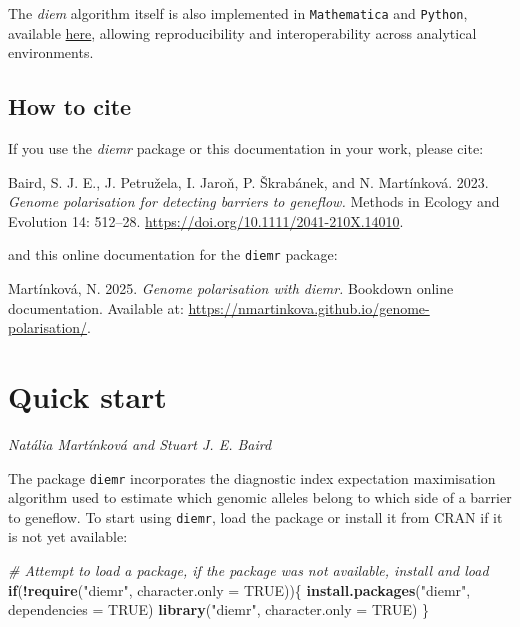\documentclass[
]{book}
\newenvironment{Shaded}{\begin{snugshade}}{\end{snugshade}}
\newcommand{\AttributeTok}[1]{\textcolor[rgb]{0.13,0.29,0.53}{#1}}
\newcommand{\CommentTok}[1]{\textcolor[rgb]{0.56,0.35,0.01}{\textit{#1}}}
\newcommand{\ConstantTok}[1]{\textcolor[rgb]{0.56,0.35,0.01}{#1}}
\newcommand{\ControlFlowTok}[1]{\textcolor[rgb]{0.13,0.29,0.53}{\textbf{#1}}}
\newcommand{\FunctionTok}[1]{\textcolor[rgb]{0.13,0.29,0.53}{\textbf{#1}}}
\newcommand{\NormalTok}[1]{#1}
\newcommand{\SpecialCharTok}[1]{\textcolor[rgb]{0.81,0.36,0.00}{\textbf{#1}}}
\newcommand{\StringTok}[1]{\textcolor[rgb]{0.31,0.60,0.02}{#1}}
\begin{document}
The \emph{diem} algorithm itself is also implemented in \texttt{Mathematica} and \texttt{Python}, available \href{https://github.com/StuartJEBaird/diem}{here}, allowing reproducibility and interoperability across analytical environments.

\section{How to cite}\label{how-to-cite}

If you use the \emph{diemr} package or this documentation in your work, please cite:

Baird, S. J. E., J. Petružela, I. Jaroň, P. Škrabánek, and N. Martínková. 2023. \emph{Genome polarisation for detecting barriers to geneflow.} Methods in Ecology and Evolution 14: 512--28. \url{https://doi.org/10.1111/2041-210X.14010}.

and this online documentation for the \texttt{diemr} package:

Martínková, N. 2025. \emph{Genome polarisation with diemr.} Bookdown online documentation. Available at: \url{https://nmartinkova.github.io/genome-polarisation/}.

\chapter{Quick start}\label{intro}

\emph{Natália Martínková and Stuart J. E. Baird}

The package \texttt{diemr} incorporates the diagnostic index expectation maximisation algorithm used to
estimate which genomic alleles belong to which side of a barrier to geneflow. To start
using \texttt{diemr}, load the package or install it from CRAN if it is not yet available:

\begin{Shaded}
\begin{Highlighting}[]
\CommentTok{\# Attempt to load a package, if the package was not available, install and load}
\ControlFlowTok{if}\NormalTok{(}\SpecialCharTok{!}\FunctionTok{require}\NormalTok{(}\StringTok{"diemr"}\NormalTok{, }\AttributeTok{character.only =} \ConstantTok{TRUE}\NormalTok{))\{}
    \FunctionTok{install.packages}\NormalTok{(}\StringTok{"diemr"}\NormalTok{, }\AttributeTok{dependencies =} \ConstantTok{TRUE}\NormalTok{)}
    \FunctionTok{library}\NormalTok{(}\StringTok{"diemr"}\NormalTok{, }\AttributeTok{character.only =} \ConstantTok{TRUE}\NormalTok{)}
\NormalTok{\}}
\end{Highlighting}
\end{Shaded}
\end{document}
